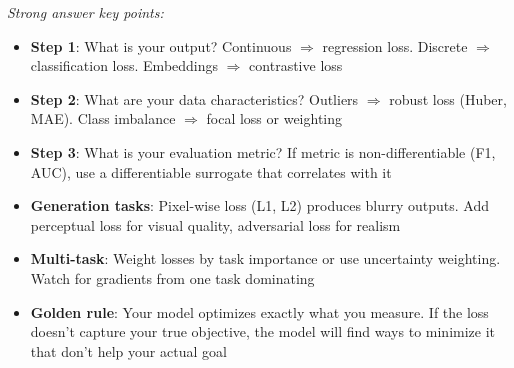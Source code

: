 \documentclass[../../main.tex]{subfiles}
\begin{document}
\begin{interviewquestions}
\textit{Strong answer key points:}
\begin{itemize}
    \item \textbf{Step 1}: What is your output? Continuous $\Rightarrow$ regression loss. Discrete $\Rightarrow$ classification loss. Embeddings $\Rightarrow$ contrastive loss
    \item \textbf{Step 2}: What are your data characteristics? Outliers $\Rightarrow$ robust loss (Huber, MAE). Class imbalance $\Rightarrow$ focal loss or weighting
    \item \textbf{Step 3}: What is your evaluation metric? If metric is non-differentiable (F1, AUC), use a differentiable surrogate that correlates with it
    \item \textbf{Generation tasks}: Pixel-wise loss (L1, L2) produces blurry outputs. Add perceptual loss for visual quality, adversarial loss for realism
    \item \textbf{Multi-task}: Weight losses by task importance or use uncertainty weighting. Watch for gradients from one task dominating
    \item \textbf{Golden rule}: Your model optimizes exactly what you measure. If the loss doesn't capture your true objective, the model will find ways to minimize it that don't help your actual goal
\end{itemize}

\end{interviewquestions}
\end{document}
